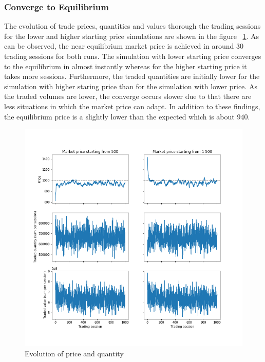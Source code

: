 

\subsubsection{Converge to Equilibrium}
The evolution of trade prices, quantities and values thorough
the trading sessions for the lower and higher starting price simulations 
are shown in the figure ~\ref{fig:basic_trades}. As can be observed,
the near equilibrium market price is achieved in around 30 trading
sessions for both runs. The simulation with lower starting price converges
to the equilibrium in almost instantly whereas for the higher starting
price it takes more sessions. Furthermore, the traded quantities are
initially lower for the simulation with higher staring price than 
for the simulation with lower price. As the traded volumes are lower,
the converge occurs slower due to that there are less situations in
which the market price can adapt. In addition to these findings, 
the equilibrium price is a slightly lower than the expected which is 
about 940.

\begin{figure}
    \includegraphics[width=\linewidth]{plots/basic_trades.png}
    \caption{Evolution of price and quantity}
    \label{fig:basic_trades}
\end{figure}

